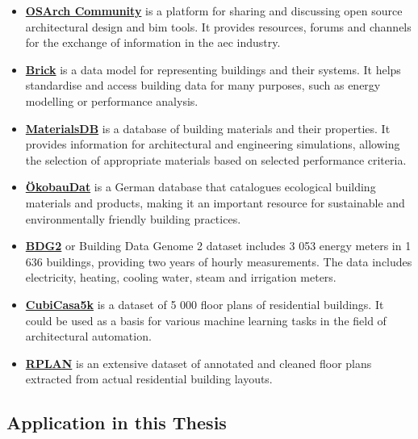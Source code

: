 \documentclass[a4paper, 12pt]{report}
\begin{document}
\begin{itemize}

\item \href{https://community.osarch.org/}{\textbf{OSArch Community}} is a platform for sharing and discussing \gls{open source} architectural design and \acrshort{bim} tools. It provides resources, forums and channels for the exchange of information in the \acrshort{aec} industry.

\item \href{https://github.com/BrickSchema/brick}{\textbf{Brick}} is a data model for representing buildings and their systems. It helps standardise and access building data for many purposes, such as energy modelling or performance analysis.

\item \href{http://www.materialsdb.org/}{\textbf{MaterialsDB}} is a database of building materials and their properties. It provides information for architectural and engineering simulations, allowing the selection of appropriate materials based on selected performance criteria.

\item \href{https://www.oekobaudat.de/}{\textbf{ÖkobauDat}} is a German database that catalogues ecological building materials and products, making it an important resource for sustainable and environmentally friendly building practices.

\item \href{https://github.com/buds-lab/building-data-genome-project-2}{\textbf{BDG2}} or Building Data Genome 2 dataset includes 3 053 energy meters in 1 636 buildings, providing two years of hourly measurements. The data includes electricity, heating, cooling water, steam and irrigation meters.

\item \href{https://github.com/CubiCasa/CubiCasa5k}{\textbf{CubiCasa5k}} is a dataset of 5 000 floor plans of residential buildings. It could be used as a basis for various machine learning tasks in the field of architectural automation.

\item \href{https://github.com/zzilch/RPLAN-Toolbox}{\textbf{RPLAN}} is an extensive dataset of annotated and cleaned floor plans extracted from actual residential building layouts.

\end{itemize}

\subsection{Application in this Thesis}\label{subsec:application-in-this-thesis}
\end{document}
